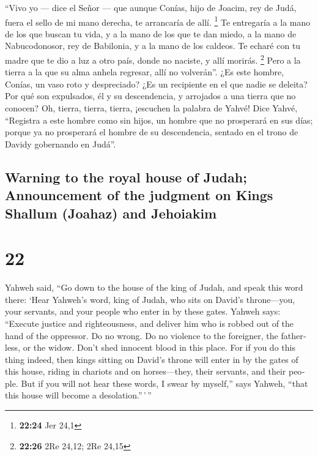\begin{paracol}{2}
 ``Vivo yo --- dice el Señor --- que aunque Conías, hijo
de Joacim, rey de Judá, fuera el sello de mi mano derecha, te arrancaría
de allí. \footnote{\textbf{22:24} Jer 24,1}  Te
entregaría a la mano de los que buscan tu vida, y a la mano de los que
te dan miedo, a la mano de Nabucodonosor, rey de Babilonia, y a la mano
de los caldeos.  Te echaré con tu madre que te dio a luz
a otro país, donde no naciste, y allí morirás. \footnote{\textbf{22:26}
  2Re 24,12; 2Re 24,15}  Pero a la tierra a la que su
alma anhela regresar, allí no volverán''.  ¿Es este
hombre, Conías, un vaso roto y despreciado? ¿Es un recipiente en el que
nadie se deleita? Por qué son expulsados, él y su descendencia, y
arrojados a una tierra que no conocen?  Oh, tierra,
tierra, tierra, ¡escuchen la palabra de Yahvé!  Dice
Yahvé, ``Registra a este hombre como sin hijos, un hombre que no
prosperará en sus días; porque ya no prosperará el hombre de su
descendencia, sentado en el trono de Davidy gobernando en Judá''.

\switchcolumn
\begin{otherlanguage}{english}

\hypertarget{warning-to-the-royal-house-of-judah-announcement-of-the-judgment-on-kings-shallum-joahaz-and-jehoiakim}{%
\subsection{Warning to the royal house of Judah; Announcement of the
judgment on Kings Shallum (Joahaz) and
Jehoiakim}\label{warning-to-the-royal-house-of-judah-announcement-of-the-judgment-on-kings-shallum-joahaz-and-jehoiakim}}

\hypertarget{section-43}{%
\section{22}\label{section-43}}

 Yahweh said, ``Go down to the house of the king of Judah,
and speak this word there:  `Hear Yahweh's word, king of
Judah, who sits on David's throne---you, your servants, and your people
who enter in by these gates.  Yahweh says: ``Execute
justice and righteousness, and deliver him who is robbed out of the hand
of the oppressor. Do no wrong. Do no violence to the foreigner, the
fatherless, or the widow. Don't shed innocent blood in this place.
 For if you do this thing indeed, then kings sitting on
David's throne will enter in by the gates of this house, riding in
chariots and on horses---they, their servants, and their people.
 But if you will not hear these words, I swear by
myself,'' says Yahweh, ``that this house will become a
desolation.''\,'\,''


\end{otherlanguage}
\end{paracol}
